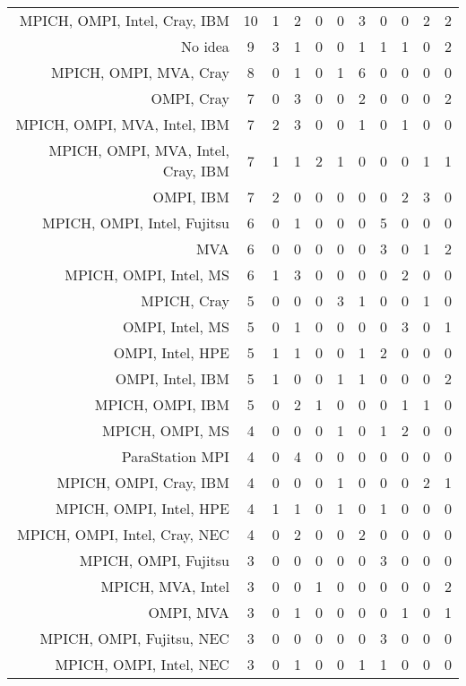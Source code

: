 {\begin{landscape}
\begin{longtable}[htb]{r|c|c|c|c|c|c|c|c|c|c}
{MPICH, OMPI, Intel, Cray, IBM} & 10 & 1 & 2 & 0 & 0 & 3 & 0 & 0 & 2 & 2 \\%
{No idea} & 9 & 3 & 1 & 0 & 0 & 1 & 1 & 1 & 0 & 2 \\%
{MPICH, OMPI, MVA, Cray} & 8 & 0 & 1 & 0 & 1 & 6 & 0 & 0 & 0 & 0 \\%
{OMPI, Cray} & 7 & 0 & 3 & 0 & 0 & 2 & 0 & 0 & 0 & 2 \\%
{MPICH, OMPI, MVA, Intel, IBM} & 7 & 2 & 3 & 0 & 0 & 1 & 0 & 1 & 0 & 0 \\%
{MPICH, OMPI, MVA, Intel, Cray, IBM} & 7 & 1 & 1 & 2 & 1 & 0 & 0 & 0 & 1 & 1 \\%
{OMPI, IBM} & 7 & 2 & 0 & 0 & 0 & 0 & 0 & 2 & 3 & 0 \\%
{MPICH, OMPI, Intel, Fujitsu} & 6 & 0 & 1 & 0 & 0 & 0 & 5 & 0 & 0 & 0 \\%
{MVA} & 6 & 0 & 0 & 0 & 0 & 0 & 3 & 0 & 1 & 2 \\%
{MPICH, OMPI, Intel, MS} & 6 & 1 & 3 & 0 & 0 & 0 & 0 & 2 & 0 & 0 \\%
{MPICH, Cray} & 5 & 0 & 0 & 0 & 3 & 1 & 0 & 0 & 1 & 0 \\%
{OMPI, Intel, MS} & 5 & 0 & 1 & 0 & 0 & 0 & 0 & 3 & 0 & 1 \\%
{OMPI, Intel, HPE} & 5 & 1 & 1 & 0 & 0 & 1 & 2 & 0 & 0 & 0 \\%
{OMPI, Intel, IBM} & 5 & 1 & 0 & 0 & 1 & 1 & 0 & 0 & 0 & 2 \\%
{MPICH, OMPI, IBM} & 5 & 0 & 2 & 1 & 0 & 0 & 0 & 1 & 1 & 0 \\%
{MPICH, OMPI, MS} & 4 & 0 & 0 & 0 & 1 & 0 & 1 & 2 & 0 & 0 \\%
{ParaStation MPI} & 4 & 0 & 4 & 0 & 0 & 0 & 0 & 0 & 0 & 0 \\%
{MPICH, OMPI, Cray, IBM} & 4 & 0 & 0 & 0 & 1 & 0 & 0 & 0 & 2 & 1 \\%
{MPICH, OMPI, Intel, HPE} & 4 & 1 & 1 & 0 & 1 & 0 & 1 & 0 & 0 & 0 \\%
{MPICH, OMPI, Intel, Cray, NEC} & 4 & 0 & 2 & 0 & 0 & 2 & 0 & 0 & 0 & 0 \\%
{MPICH, OMPI, Fujitsu} & 3 & 0 & 0 & 0 & 0 & 0 & 3 & 0 & 0 & 0 \\%
{MPICH, MVA, Intel} & 3 & 0 & 0 & 1 & 0 & 0 & 0 & 0 & 0 & 2 \\%
{OMPI, MVA} & 3 & 0 & 1 & 0 & 0 & 0 & 0 & 1 & 0 & 1 \\%
{MPICH, OMPI, Fujitsu, NEC} & 3 & 0 & 0 & 0 & 0 & 0 & 3 & 0 & 0 & 0 \\%
{MPICH, OMPI, Intel, NEC} & 3 & 0 & 1 & 0 & 0 & 1 & 1 & 0 & 0 & 0 \\%

\end{longtable}
\end{landscape}}
